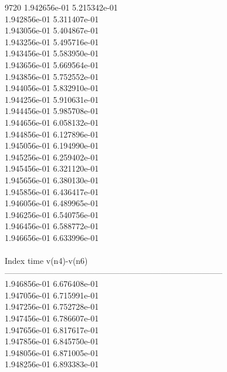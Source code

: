 9720	1.942656e-01	5.215342e-01	\\ 	1.942856e-01	5.311407e-01	\\ 	1.943056e-01	5.404867e-01	\\ 	1.943256e-01	5.495716e-01	\\ 	1.943456e-01	5.583950e-01	\\ 	1.943656e-01	5.669564e-01	\\ 	1.943856e-01	5.752552e-01	\\ 	1.944056e-01	5.832910e-01	\\ 	1.944256e-01	5.910631e-01	\\ 	1.944456e-01	5.985708e-01	\\ 	1.944656e-01	6.058132e-01	\\ 	1.944856e-01	6.127896e-01	\\ 	1.945056e-01	6.194990e-01	\\ 	1.945256e-01	6.259402e-01	\\ 	1.945456e-01	6.321120e-01	\\ 	1.945656e-01	6.380130e-01	\\ 	1.945856e-01	6.436417e-01	\\ 	1.946056e-01	6.489965e-01	\\ 	1.946256e-01	6.540756e-01	\\ 	1.946456e-01	6.588772e-01	\\ 	1.946656e-01	6.633996e-01	\\ \hline
\\ \hline
Index   time            v(n4)-v(n6)     \\ \hline
--------------------------------------------------------------------------------\\ 	1.946856e-01	6.676408e-01	\\ 	1.947056e-01	6.715991e-01	\\ 	1.947256e-01	6.752728e-01	\\ 	1.947456e-01	6.786607e-01	\\ 	1.947656e-01	6.817617e-01	\\ 	1.947856e-01	6.845750e-01	\\ 	1.948056e-01	6.871005e-01	\\ 	1.948256e-01	6.893383e-01	\\ \hline
